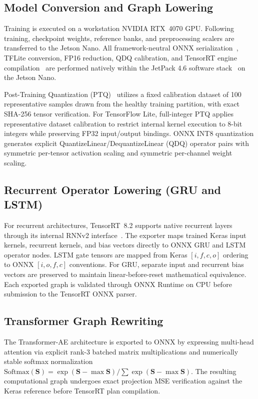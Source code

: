 \documentclass[11pt,a4paper]{article}
\begin{document}
\subsection{Model Conversion and Graph Lowering}
Training is executed on a workstation NVIDIA RTX~4070 GPU. Following training, checkpoint weights, reference banks, and preprocessing scalers are transferred to the Jetson Nano. All framework-neutral ONNX serialization~\cite{bai2019onnx}, TFLite conversion, FP16 reduction, QDQ calibration, and TensorRT engine compilation~\cite{nvidia2020tensorrt} are performed natively within the JetPack 4.6 software stack~\cite{nvidiajetpackarchive} on the Jetson Nano.

Post-Training Quantization (PTQ)~\cite{tensorflowliteptq,onnxruntimequantization} utilizes a fixed calibration dataset of 100 representative samples drawn from the healthy training partition, with exact SHA-256 tensor verification. For TensorFlow Lite, full-integer PTQ applies representative dataset calibration to restrict internal kernel execution to 8-bit integers while preserving FP32 input/output bindings. ONNX INT8 quantization generates explicit QuantizeLinear/DequantizeLinear (QDQ) operator pairs with symmetric per-tensor activation scaling and symmetric per-channel weight scaling.

\subsection{Recurrent Operator Lowering (GRU and LSTM)}
For recurrent architectures, TensorRT~8.2 supports native recurrent layers through its internal RNNv2 interface~\cite{nvidia2022tensorrt825}. The exporter maps trained Keras input kernels, recurrent kernels, and bias vectors directly to ONNX GRU and LSTM operator nodes. LSTM gate tensors are mapped from Keras $[i,f,c,o]$ ordering to ONNX $[i,o,f,c]$ conventions. For GRU, separate input and recurrent bias vectors are preserved to maintain linear-before-reset mathematical equivalence. Each exported graph is validated through ONNX Runtime on CPU before submission to the TensorRT ONNX parser.

\subsection{Transformer Graph Rewriting}
The Transformer-AE architecture is exported to ONNX by expressing multi-head attention via explicit rank-3 batched matrix multiplications and numerically stable softmax normalization $\mathrm{Softmax}(\mathbf{S}) = \exp(\mathbf{S} - \max \mathbf{S}) / \sum \exp(\mathbf{S} - \max \mathbf{S})$. The resulting computational graph undergoes exact projection MSE verification against the Keras reference before TensorRT plan compilation.
\end{document}
